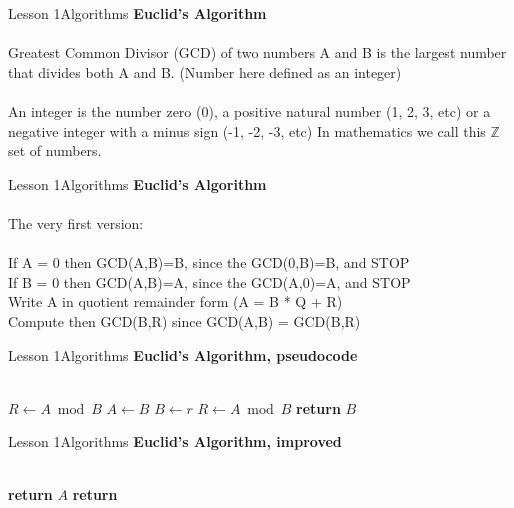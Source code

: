 \documentclass[aspectratio=1610]{beamer}
\begin{document}
\begin{frame}{Lesson 1}{Algorithms}
\Large
\textbf{Euclid's Algorithm}\\~\\ 
Greatest Common Divisor (GCD) of two numbers A and B is the largest number that divides both A and B. (Number here defined as an \alert{integer})\\~\\

An integer is the number zero (0), a positive natural number (1, 2, 3, etc) or a negative integer with a minus sign (-1, -2, -3, etc) In mathematics we call this \(\mathbb{Z}\) set of numbers.
\end{frame}


\begin{frame}{Lesson 1}{Algorithms}
\Large
\textbf{Euclid's Algorithm}\\~\\
The very first version:\\~\\ 
If A = 0 then GCD(A,B)=B, since the GCD(0,B)=B, and STOP\\  
If B = 0 then GCD(A,B)=A, since the GCD(A,0)=A, and STOP\\  
Write A in quotient remainder form (A = B * Q + R)\\
Compute then GCD(B,R) since GCD(A,B) = GCD(B,R)
\end{frame}


\begin{frame}{Lesson 1}{Algorithms}
\Large
\textbf{Euclid's Algorithm, pseudocode}\\~\\

\label{GCD}
\begin{algorithmic}[1]
   \State $R\gets A\bmod B$
      \State $A\gets B$
      \State $B\gets r$
      \State $R\gets A\bmod B$
   \EndWhile\label{GCDendwhile}
   \State \textbf{return} $B$
\EndProcedure
\end{algorithmic}
\end{frame}



\begin{frame}{Lesson 1}{Algorithms}
\Large
\textbf{Euclid's Algorithm, improved}\\~\\

\label{Euclid}
\begin{algorithmic}[1]
    \State \textbf{return} $A$
\Else \State \textbf{return} 
\EndIf
\EndProcedure
\end{algorithmic}
\end{frame}
\end{document}

